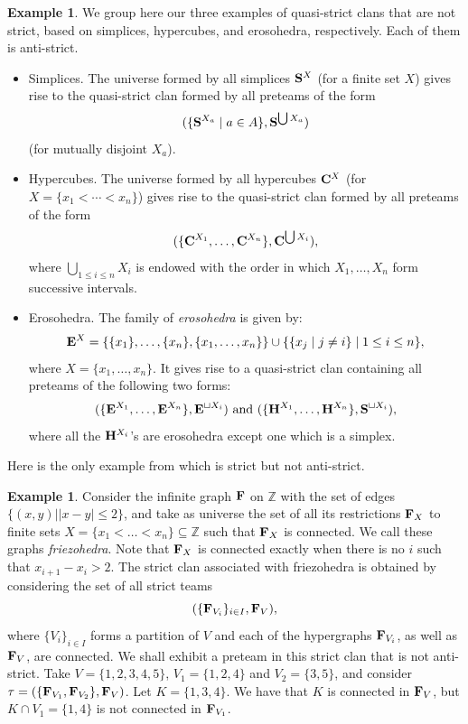 \documentclass{article}
\theoremstyle{plain}
\theoremstyle{definition}
\newtheorem{example}[thm]{\sc Example}
\newcommand{\Union}{\bigcup}
\newcommand{\set}[1]{\{#1\}}
\newcommand{\setc}[2]{\set{#1 \mid #2}}
\newcommand{\hyper}[1]{{\bf #1}}
\newcommand{\Friezo}{\hyper{F}}
\begin{document}
\begin{example} \label{quasistrict-antistrict-examples}
We group here our three examples of quasi-strict clans that are not strict, based on simplices, hypercubes, and erosohedra, respectively. Each of them is anti-strict.
\begin{itemize}
\item Simplices. The universe formed by all simplices $\hyper{S}^X$ (for a  finite set $X$) gives rise to the quasi-strict clan formed by all preteams of the form 
$$(\setc{\hyper{S}^{X_a}}{a\in A},\hyper{S}^{\Union X_a})$$ (for mutually disjoint $X_a$).  
\item Hypercubes.  The universe formed by all   hypercubes $\hyper{C}^X$ (for $X=\set{x_1<\cdots<x_n}$)  gives rise to the  quasi-strict clan formed by all preteams of the form 
$$(\{\hyper{C}^{X_1},\ldots,\hyper{C}^{X_n}\},\hyper{C}^{\Union X_i}),$$ where $\Union_{1\leq i\leq n} X_i$ is endowed with the  order in which  $X_1,\ldots,X_n$ form successive intervals. 
\item Erosohedra. The family of \emph{erosohedra} is given by:
\begin{align*}
 \hyper{E}^X=\set{\set{x_1},\ldots,\set{x_n},\set{x_1,\ldots,x_n}}\cup \setc{\setc{x_j}{j \neq i}}{1\leq i\leq n},
\end{align*} 
where $X=\{x_1, \ldots, x_n\}$. It gives rise to a quasi-strict clan containing all preteams of the following two forms:
$$(\set{\hyper{E}^{X_1},\ldots, \hyper{E}^{X_n}},\hyper{E}^{\sqcup X_i}) \mbox{ and }  
(\set{\hyper{H}^{X_1},\ldots, \hyper{H}^{X_n}},\hyper{S}^{\sqcup X_i}),$$ where all the $\hyper{H}^{X_i}$'s are erosohedra except one which is a simplex. 
\end{itemize} \end{example}

Here is the only example from \cite{PLBJ1} which is strict but not anti-strict.
\begin{example} \label{friezohedra-non-example}
 Consider the infinite graph $\Friezo$ on $\mathbb{Z}$ with the set of edges $\{(x,y) ||x-y|\leq 2 \}$, and take as universe the set of all its restrictions $\Friezo_X$ to finite sets $X=\{x_1<\dots<x_n\} \subseteq \mathbb{Z}$ such that $\Friezo_X$ is connected. We call these graphs \emph{friezohedra}. Note that $\Friezo_X$  is connected  exactly when there is no $i$ such that $x_{i+1}-x_i>2$. The strict clan associated with friezohedra is obtained by considering the set of all strict teams $$(\{\hyper{F}_{V_i}\}_{i \in I}, \hyper{F}_V),$$ where $\{V_i\}_{i \in I}$ forms a partition of $V$ and each of the hypergraphs $\hyper{F}_{V_i}$, as well as $\hyper{F}_{V}$, are connected.  
 We shall exhibit  a preteam in this strict clan that is not anti-strict. Take $V=\set{1,2,3,4,5}$,  $V_1=\set{1,2,4}$ and $V_2=\set{3,5}$, and consider $\tau=(\set{\hyper{F}_{V_1},\hyper{F}_{V_2}},\hyper{F}_V)$. Let $K=\set{1,3,4}$. We have that $K$ is connected in $\hyper{F}_{V}$, but $K\cap V_1=\set{1,4}$ is not connected in $\hyper{F}_{V_1}$.
\end{example}
\end{document}
